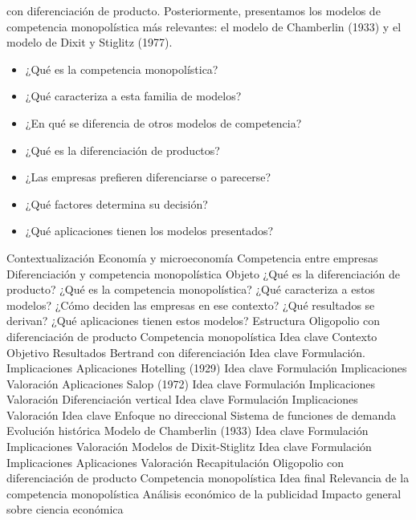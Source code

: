 \documentclass{nuevotema}
\begin{document}
con diferenciación de producto. Posteriormente, presentamos los modelos de competencia monopolística más relevantes: el modelo de Chamberlin (1933) y el modelo de Dixit y Stiglitz (1977).

\ideaclave


\begin{itemize}
	\item ¿Qué es la competencia monopolística?
	\item ¿Qué caracteriza a esta familia de modelos?
	\item ¿En qué se diferencia de otros modelos de competencia?
	\item ¿Qué es la diferenciación de productos?
	\item ¿Las empresas prefieren diferenciarse o parecerse?
	\item ¿Qué factores determina su decisión?
	\item ¿Qué aplicaciones tienen los modelos presentados?
\end{itemize}

\esquemacorto

\begin{esquema}[enumerate]
	\1[] 
		\2 Contextualización
			\3 Economía y microeconomía
			\3 Competencia entre empresas
			\3 Diferenciación y competencia monopolística
		\2 Objeto
			\3 ¿Qué es la diferenciación de producto?
			\3 ¿Qué es la competencia monopolística?
			\3 ¿Qué caracteriza a estos modelos?
			\3 ¿Cómo deciden las empresas en ese contexto?
			\3 ¿Qué resultados se derivan?
			\3 ¿Qué aplicaciones tienen estos modelos?
		\2 Estructura
			\3 Oligopolio con diferenciación de producto
			\3 Competencia monopolística
	\1 
		\2 Idea clave
			\3 Contexto
			\3 Objetivo
			\3 Resultados
		\2 Bertrand con diferenciación
			\3 Idea clave
			\3 Formulación.
			\3 Implicaciones
			\3 Aplicaciones
		\2 Hotelling (1929)
			\3 Idea clave
			\3 Formulación
			\3 Implicaciones
			\3 Valoración
			\3 Aplicaciones
		\2 Salop (1972)
			\3 Idea clave
			\3 Formulación
			\3 Implicaciones
			\3 Valoración
		\2 Diferenciación vertical
			\3 Idea clave
			\3 Formulación
			\3 Implicaciones
			\3 Valoración
	\1 
		\2 Idea clave
			\3 Enfoque no direccional
			\3 Sistema de funciones de demanda
			\3 Evolución histórica
		\2 Modelo de Chamberlin (1933)
			\3 Idea clave
			\3 Formulación
			\3 Implicaciones
			\3 Valoración
		\2 Modelos de Dixit-Stiglitz
			\3 Idea clave
			\3 Formulación
			\3 Implicaciones
			\3 Aplicaciones
			\3 Valoración
	\1[] 
		\2 Recapitulación
			\3 Oligopolio con diferenciación de producto
			\3 Competencia monopolística
		\2 Idea final
			\3 Relevancia de la competencia monopolística
			\3 Análisis económico de la publicidad
			\3 Impacto general sobre ciencia económica

\end{esquema}
\end{document}
